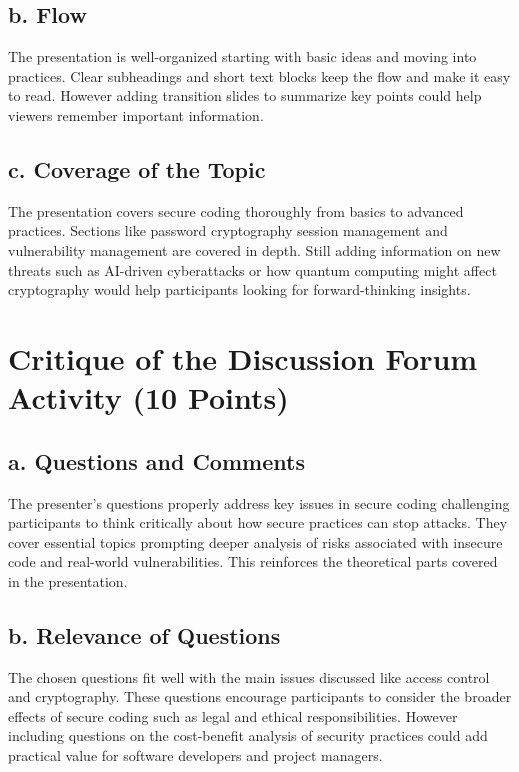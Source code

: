 \documentclass{article}
\begin{document}
\subsection*{b. Flow}

The presentation is well-organized starting with basic ideas and moving into  practices. Clear subheadings and short text blocks keep the flow and make it easy to read. However adding transition slides to summarize key points could help viewers remember important information.

\subsection*{c. Coverage of the Topic}

The presentation covers secure coding thoroughly from basics to advanced practices. Sections like password cryptography session management and vulnerability management are covered in depth. Still adding information on new threats such as AI-driven cyberattacks or how quantum computing might affect cryptography would help participants looking for forward-thinking insights.

\section*{Critique of the Discussion Forum Activity (10 Points)}

\subsection*{a. Questions and Comments}

The presenter's questions properly address key issues in secure coding challenging participants to think critically about how secure practices can stop attacks. They cover essential topics prompting deeper analysis of risks associated with insecure code and real-world vulnerabilities. This reinforces the theoretical parts covered in the presentation.

\subsection*{b. Relevance of Questions}

The chosen questions fit well with the main issues discussed like access control and cryptography. These questions encourage participants to consider the broader effects of secure coding such as legal and ethical responsibilities. However including questions on the cost-benefit analysis of security practices could add practical value for software developers and project managers.
\end{document}
